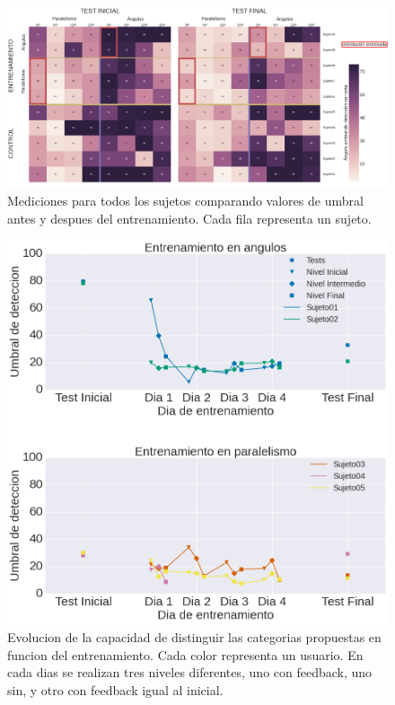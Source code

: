 \documentclass{article}
\begin{document}
    \begin{figure}
        \centering
        \includegraphics[width=\textwidth]{Imagenes/TransferenciaHeatmap.png}
        \caption{Mediciones para todos los sujetos comparando valores de umbral antes y despues del entrenamiento. Cada fila representa un sujeto.}
        \label{fig:DatosTest}
    \end{figure}
    
    \begin{figure}
        \centering
        \includegraphics[width=\textwidth]{Imagenes/TransferenciaEntrenamientoNuevo.png}
        \caption{Evolucion de la capacidad de distinguir las categorias propuestas en funcion del entrenamiento. Cada color representa un usuario. En cada dias se realizan tres niveles diferentes, uno con feedback, uno sin, y otro con feedback igual al inicial.}
        \label{fig:DatosEntrenamiento}
    \end{figure}
    
\end{document}
